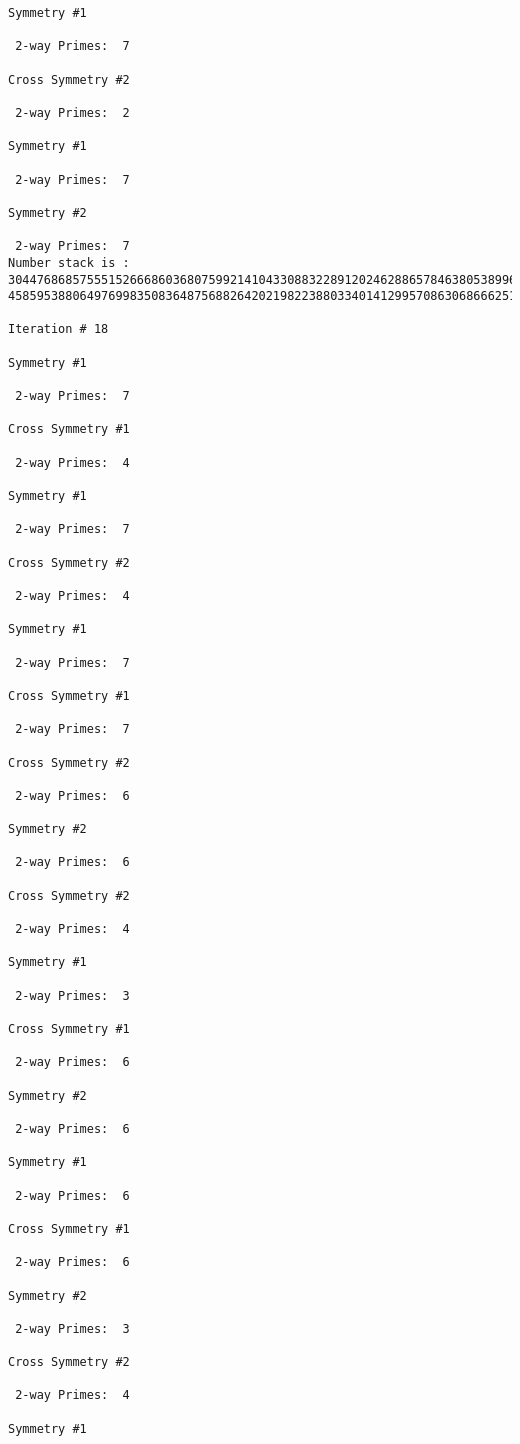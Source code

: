 {{{{\begin{verbatim}
Symmetry #1

 2-way Primes: 	7

Cross Symmetry #2

 2-way Primes: 	2

Symmetry #1

 2-way Primes: 	7

Symmetry #2

 2-way Primes: 	7
Number stack is :
30447686857555152666860368075992141043308832289120246288657846380538996794608835958544046240163340857
45859538806497699835083648756882642021982238803340141299570863068666251555758686744037580433610426404

Iteration #	18

Symmetry #1

 2-way Primes: 	7

Cross Symmetry #1

 2-way Primes: 	4

Symmetry #1

 2-way Primes: 	7

Cross Symmetry #2

 2-way Primes: 	4

Symmetry #1

 2-way Primes: 	7

Cross Symmetry #1

 2-way Primes: 	7

Cross Symmetry #2

 2-way Primes: 	6

Symmetry #2

 2-way Primes: 	6

Cross Symmetry #2

 2-way Primes: 	4

Symmetry #1

 2-way Primes: 	3

Cross Symmetry #1

 2-way Primes: 	6

Symmetry #2

 2-way Primes: 	6

Symmetry #1

 2-way Primes: 	6

Cross Symmetry #1

 2-way Primes: 	6

Symmetry #2

 2-way Primes: 	3

Cross Symmetry #2

 2-way Primes: 	4

Symmetry #1


\end{verbatim}}}}}
